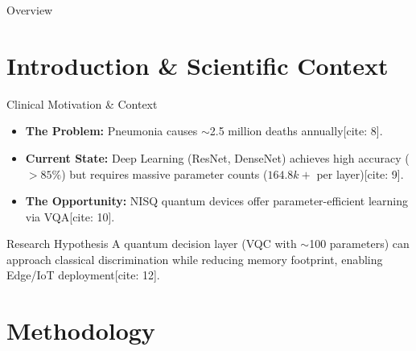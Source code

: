 \documentclass[aspectratio=169, 10pt]{beamer}
\begin{document}
\begin{frame}{Overview}
  \tableofcontents
\end{frame}

\section{Introduction \& Scientific Context}

\begin{frame}{Clinical Motivation & Context}
  \begin{itemize}
    \item \textbf{The Problem:} Pneumonia causes $\sim$2.5 million deaths annually[cite: 8].
    \item \textbf{Current State:} Deep Learning (ResNet, DenseNet) achieves high accuracy ($>85\%$) but requires massive parameter counts ($164.8k+$ per layer)[cite: 9].
    \item \textbf{The Opportunity:} NISQ quantum devices offer parameter-efficient learning via VQA[cite: 10].
  \end{itemize}
  
  \vspace{0.5cm}
  
  \begin{block}{Research Hypothesis}
    A quantum decision layer (VQC with $\sim$100 parameters) can approach classical discrimination while reducing memory footprint, enabling Edge/IoT deployment[cite: 12].
  \end{block}
\end{frame}

\section{Methodology}
\end{document}
